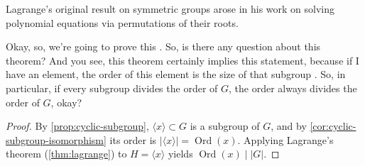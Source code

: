 \begin{aiNote}
Lagrange's original result on symmetric groups arose in his work on solving polynomial equations via permutations of their roots.
\end{aiNote}

\begin{speech}[00:12:05 - 00:12:34]
Okay, so, we're going to prove this . So, is there any question about this theorem? And you see, this theorem certainly implies this  statement, because if I have an element, the order of this element is the size of that subgroup . So, in particular, if every subgroup divides the order of $G$, the order always divides the order of $G$, okay?
\end{speech}

\begin{content}

\begin{proof}
By \cref{prop:cyclic-subgroup}, $\langle x \rangle \subset G$ is a subgroup of $G$, and by \cref{cor:cyclic-subgroup-isomorphism} its order is $|\langle x \rangle| = \operatorname{Ord}(x)$. Applying Lagrange's theorem (\cref{thm:lagrange}) to $H = \langle x \rangle$ yields $\operatorname{Ord}(x) \mid |G|$.
\end{proof}
\end{content}

